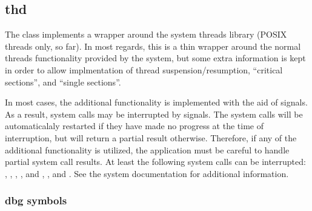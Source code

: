 %
%
%
%
%              

\subsection{thd}
\label{thd}

The  class implements a wrapper around the system threads library
(POSIX threads only, so far).  In most regards, this is a thin wrapper around
the normal threads functionality provided by the system, but some extra
information is kept in order to allow implmentation of thread
suspension/resumption, ``critical sections'', and ``single sections''.

In most cases, the additional functionality is implemented with the aid of
signals.  As a result, system calls may be interrupted by signals.  The system
calls will be automaticalaly restarted if they have made no progress at the time
of interruption, but will return a partial result otherwise.  Therefore, if any
of the additional functionality is utilized, the application must be careful to
handle partial system call results.  At least the following system calls can be
interrupted: , , ,
,  and , ,
and .  See the system documentation for additional information.

\subsubsection{dbg symbols}

